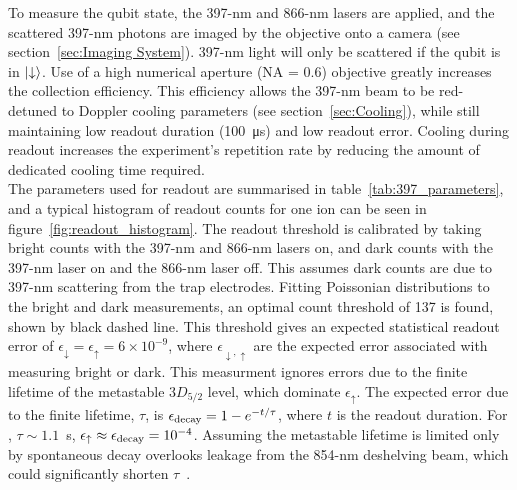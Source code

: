     To measure the qubit state, the 397-nm and 866-nm lasers
    are applied, and the scattered 397-nm photons are imaged by the objective onto a camera (see section~\ref{sec:Imaging System}). 397-nm light will only be scattered if the qubit is in $\ket{\downarrow}$.
    Use of a high numerical aperture (NA = 0.6) objective greatly increases the collection efficiency.
    This efficiency allows the 397-nm beam to be red-detuned to Doppler cooling parameters (see section~\ref{sec:Cooling}), while still maintaining low readout duration (100~\unit{\us}) and low readout error. 
    Cooling during readout increases the experiment's repetition rate by reducing the amount of dedicated cooling time required.\\
    The parameters used for readout are
    summarised in table~\ref{tab:397_parameters}, and a typical histogram of
    readout counts for one ion can be seen in
    figure~\ref{fig:readout_histogram}. The readout threshold is calibrated by taking bright counts with the 397-nm and 866-nm lasers on, and dark counts with the 397-nm laser on and the 866-nm laser off. This assumes dark counts are due to 397-nm scattering from the trap electrodes. 
    Fitting Poissonian distributions to the bright and dark measurements, an optimal count threshold of
    137 is found, shown by black dashed line. This threshold gives an expected
    statistical readout error of $\epsilon_\downarrow = \epsilon_\uparrow = 6\times10^{-9}$, where $\epsilon_{\downarrow,\uparrow}$ are the expected error associated with measuring bright or dark. This measurment ignores errors due to the
    finite lifetime of the metastable $3D_{5/2}$ level, which dominate $\epsilon_\uparrow$. The expected error due
    to the finite lifetime, $\tau$, is $\epsilon_{\rm decay} = 1 - e^{-t/\tau}$, where $t$ is the readout duration. For \ca, $\tau \sim 1.1$~s, $\epsilon_\uparrow \approx \epsilon_{\rm decay}  = 
    10^{-4}$. 
    Assuming the metastable lifetime is limited only by spontaneous decay overlooks leakage from the 854-nm deshelving beam, which could significantly shorten $\tau$~\cite{sotirova2024high-fidelity}. \\
    
